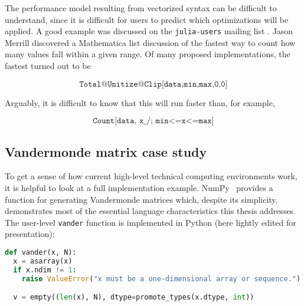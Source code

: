 {The performance model resulting from vectorized syntax can be difficult to
understand, since it is difficult for users to predict which optimizations
will be applied.
A good example was discussed on the \texttt{julia-users} mailing list \cite{jasonmerrill}.
Jason Merrill discovered a Mathematica \cite{mathematica} list discussion
of the fastest way to count how many values fall within a given range.
Of many proposed implementations, the fastest turned out to be

\vspace{-3ex}

\[ \texttt{Total@Unitize@Clip[data,{min,max},{0,0}]} \]

\noindent
Arguably, it is difficult to know that this will run faster than, for
example,

\vspace{-3ex}

\[ \texttt{Count[data,~x\_/;~min<=x<=max]} \]


\subsection{Vandermonde matrix case study}

To get a sense of how current high-level technical computing environments work,
it is helpful to look at a full implementation example.
NumPy~\cite{numpy} provides a function for generating Vandermonde matrices
which, despite its simplicity, demonstrates most of the essential language
characteristics this thesis addresses.
The user-level \texttt{vander} function is implemented in Python (here
lightly edited for presentation):

\begin{singlespace}
\begin{lstlisting}[language=python,style=ttcode]
def vander(x, N):
  x = asarray(x)
  if x.ndim != 1:
    raise ValueError("x must be a one-dimensional array or sequence.")

  v = empty((len(x), N), dtype=promote_types(x.dtype, int))


\end{lstlisting}
\end{singlespace}}
